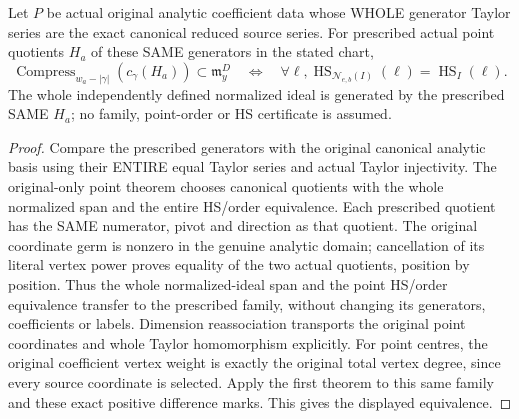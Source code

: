 \begin{theorem}
\label{hir:actual-same-canonical-point-coefficient-control-hs-iff}
\leanok
Let $P$ be actual original analytic coefficient data whose WHOLE generator
Taylor series are the exact canonical reduced source series. For prescribed
actual point quotients $H_a$ of these SAME generators in the stated chart,
\[
 \operatorname{Compress}_{w_a-|\gamma|}(c_\gamma(H_a))
       \subset\mathfrak m_y^D
 \quad\Longleftrightarrow\quad
 \forall\ell,\operatorname{HS}_{\mathcal N_{e,b}(I)}(\ell)
       =\operatorname{HS}_I(\ell).
\]
The whole independently defined normalized ideal is generated by the
prescribed SAME $H_a$; no family, point-order or HS certificate is assumed.
\end{theorem}
\begin{proof}
Compare the prescribed generators with the original canonical analytic
basis using their ENTIRE equal Taylor series and actual Taylor injectivity.
The original-only point theorem chooses canonical quotients with the whole
normalized span and the entire HS/order equivalence. Each prescribed quotient
has the SAME numerator, pivot and direction as that quotient. The original
coordinate germ is nonzero in the genuine analytic domain; cancellation of
its literal vertex power proves equality of the two actual quotients,
position by position. Thus the whole normalized-ideal span and the point
HS/order equivalence transfer to the prescribed family, without changing
its generators, coefficients or labels. Dimension reassociation transports
the original point coordinates and whole Taylor homomorphism explicitly.
For point centres, the original coefficient vertex weight is exactly the
original total vertex degree, since every source coordinate is selected.
Apply the first theorem to this same family and these exact positive
difference marks. This gives the displayed equivalence.
\end{proof}

